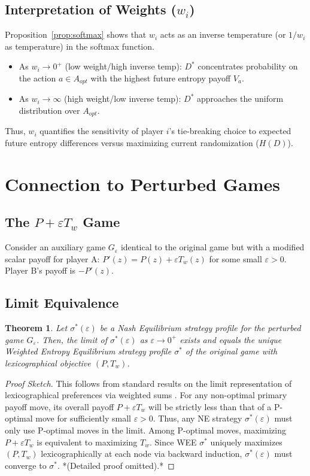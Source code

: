 \documentclass{article}
\newtheorem{theorem}{Theorem}[section]
\begin{document}
\subsection{Interpretation of Weights (\texorpdfstring{$w_i$}{wi})}
Proposition~\ref{prop:softmax} shows that $w_i$ acts as an inverse temperature (or $1/w_i$ as temperature) in the softmax function.
\begin{itemize}
    \item As $w_i \to 0^+$ (low weight/high inverse temp): $D^*$ concentrates probability on the action $a \in A_{opt}$ with the highest future entropy payoff $V_a$.
    \item As $w_i \to \infty$ (high weight/low inverse temp): $D^*$ approaches the uniform distribution over $A_{opt}$.
\end{itemize}
Thus, $w_i$ quantifies the sensitivity of player $i$'s tie-breaking choice to expected future entropy differences versus maximizing current randomization ($H(D)$).

\section{Connection to Perturbed Games}

\subsection{The \texorpdfstring{$P + \varepsilon T_w$}{P + epsilon Tw} Game}
Consider an auxiliary game $G_\varepsilon$ identical to the original game but with a modified scalar payoff for player A: $P'(z) = P(z) + \varepsilon T_w(z)$ for some small $\varepsilon > 0$. Player B's payoff is $-P'(z)$.

\subsection{Limit Equivalence}
\begin{theorem} \label{thm:limit}
Let $\sigma^*(\varepsilon)$ be a Nash Equilibrium strategy profile for the perturbed game $G_\varepsilon$. Then, the limit of $\sigma^*(\varepsilon)$ as $\varepsilon \to 0^+$ exists and equals the unique Weighted Entropy Equilibrium strategy profile $\sigma^*$ of the original game with lexicographical objective $(P, T_w)$.
\end{theorem}
\begin{proof}[Proof Sketch]
This follows from standard results on the limit representation of lexicographical preferences via weighted sums \cite{placeholder_lexico_limit}. For any non-optimal primary payoff move, its overall payoff $P + \varepsilon T_w$ will be strictly less than that of a P-optimal move for sufficiently small $\varepsilon > 0$. Thus, any NE strategy $\sigma^*(\varepsilon)$ must only use P-optimal moves in the limit. Among P-optimal moves, maximizing $P + \varepsilon T_w$ is equivalent to maximizing $T_w$. Since WEE $\sigma^*$ uniquely maximizes $(P, T_w)$ lexicographically at each node via backward induction, $\sigma^*(\varepsilon)$ must converge to $\sigma^*$. *(Detailed proof omitted).*
\end{proof}
\end{document}
